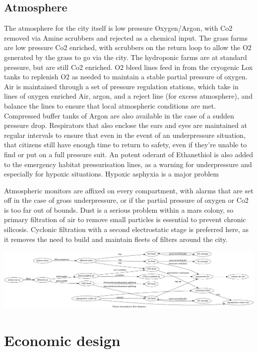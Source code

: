 \documentclass[10pt]{article}
\begin{document}
\subsection*{Atmosphere}
The atmosphere for the city itself is low pressure Oxygen/Argon, with Co2 removed via Amine scrubbers and rejected as a chemical input. The grass farms are low pressure Co2 enriched, with scrubbers on the return loop to allow the O2 generated by the grass to go via the city. The hydroponic farms are at standard pressure, but are still Co2 enriched. O2 bleed lines feed in from the cryogenic Lox tanks to replenish O2 as needed to maintain a stable partial pressure of oxygen. Air is maintained through a set of pressure regulation stations, which take in lines of oxygen enriched Air, argon, and a reject line (for excess atmosphere), and balance the lines to ensure that local atmospheric conditions are met. Compressed buffer tanks of Argon are also available in the case of a sudden pressure drop. Respirators that also enclose the ears and eyes are maintained at regular intervals to ensure that even in the event of an underpressure situation, that citizens still have enough time to return to safety, even if they're unable to find or put on a full pressure suit. An potent oderant of Ethanethiol is also added to the emergency habitat pressurisation lines, as a warning for underpressure and especially for hypoxic situations. Hypoxic asphyxia is a major problem 

Atmospheric monitors are affixed on every compartment, with alarms that are set off in the case of gross underpressure, or if the partial pressure of oxygen or Co2 is too far out of bounds. Dust is a serious problem within a mars colony, so primary filtration of air to remove small particles is essential to prevent chronic silicosis. Cyclonic filtration with a second electrostatic stage is preferred here, as it removes the need to build and maintain fleets of filters around the city. 

\includegraphics[width=1\textwidth]{fig_atmo.png}


\section*{Economic design}
\end{document}
